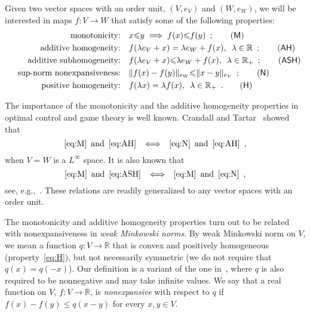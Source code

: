 \documentclass[a4paper,11pt]{amsart}
\theoremstyle{definition}
\theoremstyle{remark}
\begin{document}
Given two vector spaces with an order unit, $(V,{e}_V)$ and $(W,{e}_W)$, we will be interested in maps $f: V \to W$ that satisfy some of the following properties:
\begin{align*}
  && \text{monotonicity:} \quad & x {\leqslant} y \implies f(x) {\leqslant} f(y) \enspace ; \tag{\textsf{M}} \label{eq:M}\\
  && \text{additive homogeneity:} \quad & f(\lambda {e}_V + x) = \lambda {e}_W + f(x), \enspace \lambda \in {\mathbb{R}} \enspace ; \tag{\textsf{AH}} \label{eq:AH}\\
  && \text{additive subhomogeneity:} \quad & f(\lambda {e}_V + x) {\leqslant} \lambda {e}_W + f(x), \enspace \lambda \in {\mathbb{R}}_+ \enspace ; \tag{\textsf{ASH}} \label{eq:ASH}\\ 
  && \text{sup-norm nonexpansiveness:} \quad & \|f(x)-f(y)\|_{e_W} {\leqslant} \|x-y\|_{e_V} \enspace ; \tag{\textsf{N}} \label{eq:N}\\
  && \text{positive homogeneity:} \quad & f(\lambda x) = \lambda f(x), \enspace \lambda \in {\mathbb{R}}_+ \enspace . \tag{\textsf{H}} \label{eq:H}
\end{align*}

The importance of the monotonicity and the additive homogeneity properties in optimal control and game theory is well known.
Crandall and Tartar~\cite{CT80} showed that
\[
  \eqref{eq:M} \enspace \text{and} \enspace \eqref{eq:AH} \enspace \iff \enspace \eqref{eq:N} \enspace \text{and} \enspace \eqref{eq:AH} \enspace ,
\]
when $V = W $ is a $L^\infty$ space. 
It is also known that
\[
  \eqref{eq:M} \enspace \text{and} \enspace \eqref{eq:ASH} \enspace \iff \enspace \eqref{eq:M} \enspace \text{and} \enspace \eqref{eq:N} \enspace ,
\]
see, e.g.,~\cite{AG03}.
These relations are readily generalized to any vector spaces with an order unit.

The monotonicity and additive homogeneity properties turn out to be related with nonexpansiveness in {\em weak Minkowski norms}.  By weak Minkowski norm on $V$, we mean a function $q : V \to {\mathbb{R}}$ that is convex and positively homogeneous (property~\eqref{eq:H}), but not necessarily symmetric (we do not require that $q(x)=q(-x)$). Our definition is a variant of the one in~\cite{PT14}, where $q$ is also required to be nonnegative and may take infinite values. 
We say that a real function on $V$, $f : V \to {\mathbb{R}}$, is {\em nonexpansive} with respect to $q$ if $f(x)-f(y) {\leqslant} q(x-y)$ for every $x,y \in V$.

\end{document}
